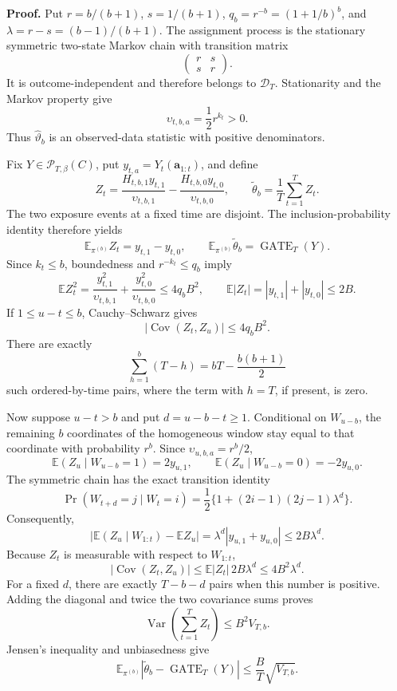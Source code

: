 \textbf{Proof.} Put \(r=b/(b+1)\), \(s=1/(b+1)\), \(q_b=r^{-b}=(1+1/b)^b\), and \(\lambda=r-s=(b-1)/(b+1)\). The assignment process is the stationary symmetric two-state Markov chain with transition matrix
\[
\begin{pmatrix}r&s\\s&r\end{pmatrix}.
\]
It is outcome-independent and therefore belongs to \(\mathcal D_T\). Stationarity and the Markov property give
\[
\upsilon_{t,b,a}=\frac12r^{k_t}>0.
\]
Thus \(\widehat\vartheta_b\) is an observed-data statistic with positive denominators.

Fix \(Y\in\mathcal P_{T,\beta}(C)\), put \(y_{t,a}=Y_t(\mathbf a_{1:t})\), and define
\[
Z_t=\frac{H_{t,b,1}y_{t,1}}{\upsilon_{t,b,1}}-\frac{H_{t,b,0}y_{t,0}}{\upsilon_{t,b,0}},
\qquad
\widetilde\theta_b=\frac1T\sum_{t=1}^T Z_t.
\]
The two exposure events at a fixed time are disjoint. The inclusion-probability identity therefore yields
\[
\mathbb E_{\pi^{(b)}}Z_t=y_{t,1}-y_{t,0},
\qquad
\mathbb E_{\pi^{(b)}}\widetilde\theta_b=\operatorname{GATE}_T(Y).
\]
Since \(k_t\le b\), boundedness and \(r^{-k_t}\le q_b\) imply
\[
\mathbb E Z_t^2
=\frac{y_{t,1}^2}{\upsilon_{t,b,1}}+\frac{y_{t,0}^2}{\upsilon_{t,b,0}}
\le4q_bB^2,
\qquad
\mathbb E|Z_t|=|y_{t,1}|+|y_{t,0}|\le2B.
\]
If \(1\le u-t\le b\), Cauchy--Schwarz gives
\[
|\operatorname{Cov}(Z_t,Z_u)|\le4q_bB^2.
\]
There are exactly
\[
\sum_{h=1}^b(T-h)=bT-\frac{b(b+1)}2
\]
such ordered-by-time pairs, where the term with \(h=T\), if present, is zero.

Now suppose \(u-t>b\) and put \(d=u-b-t\ge1\). Conditional on \(W_{u-b}\), the remaining \(b\) coordinates of the homogeneous window stay equal to that coordinate with probability \(r^b\). Since \(\upsilon_{u,b,a}=r^b/2\),
\[
\mathbb E(Z_u\mid W_{u-b}=1)=2y_{u,1},
\qquad
\mathbb E(Z_u\mid W_{u-b}=0)=-2y_{u,0}.
\]
The symmetric chain has the exact transition identity
\[
\Pr(W_{t+d}=j\mid W_t=i)
=\frac12\{1+(2i-1)(2j-1)\lambda^d\}.
\]
Consequently,
\[
\left|\mathbb E(Z_u\mid W_{1:t})-\mathbb EZ_u\right|
=\lambda^d|y_{u,1}+y_{u,0}|
\le2B\lambda^d.
\]
Because \(Z_t\) is measurable with respect to \(W_{1:t}\),
\[
|\operatorname{Cov}(Z_t,Z_u)|
\le \mathbb E|Z_t|\,2B\lambda^d
\le4B^2\lambda^d.
\]
For a fixed \(d\), there are exactly \(T-b-d\) pairs when this number is positive. Adding the diagonal and twice the two covariance sums proves
\[
\operatorname{Var}\left(\sum_{t=1}^TZ_t\right)\le B^2V_{T,b}.
\]
Jensen's inequality and unbiasedness give
\[
\mathbb E_{\pi^{(b)}}\left|\widetilde\theta_b-\operatorname{GATE}_T(Y)\right|
\le\frac BT\sqrt{V_{T,b}}.
\]

